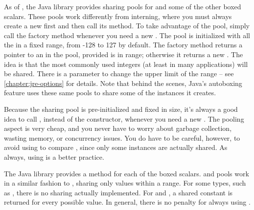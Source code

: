 As of \javafive, the Java library provides sharing pools for
 and some of the other boxed scalars. These pools
work differently from  interning, where you must always create a
new  first and then call its  method. To take
advantage of the  pool, simply call the factory method
 whenever you need a new .
The  pool is initialized with all the  in a fixed
range, from -128 to 127 by default. The factory method returns a
pointer to an  in the pool, provided  is in
range; otherwise it returns a new . 
The idea is  that the most commonly
used integers (at least in many applications) will be shared. There is a
parameter to change the upper limit of the range -- see
\autoref{chapter:jre-options} for details. Note that
behind the scenes, Java's autoboxing feature uses these same pools
to share some of the instances it creates.



Because the  sharing pool is pre-initialized and fixed in size,
it's always a good idea to call , instead of
the constructor, whenever you need a new . The pooling aspect is
very cheap, and you never have to worry about garbage collection, wasting memory, or concurrency issues.
You do have to be careful, however, to avoid using \code{==} to compare
, since only some instances are actually shared. 
As always, using  is a better practice.

The Java library provides a  method for each of the boxed
scalars.  and  pools work in a similar fashion
to , sharing only values within a range. For some types,
such as , there is no sharing actually implemented. For
 and , a shared constant is returned for every possible value. 
In general, there is no penalty for always using .

